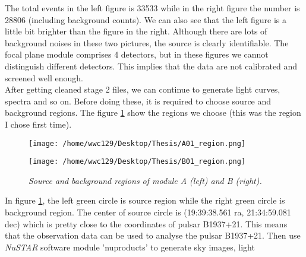 \documentclass[12pt]{report}
\newcommand{\mycaption}[1]{\caption{\textit{\footnotesize #1}}}
\begin{document}
        The total events in the left figure is 33533 while in the right figure the number is 28806 
        (including background counts). We can also see that the left figure is a little bit brighter than the figure
        in the right. Although there are lots of background noises in these two pictures, 
        the source is clearly identifiable. 
        The focal plane module comprises 4 detectors, but in these figures we cannot distinguish different detectors.
        This implies that the data are not calibrated and screened well enough. \\
        \indent After getting cleaned stage 2 files, we can continue to generate light curves, spectra and so on. 
        Before doing these, it is required to choose source and background regions. The figure \ref{fig:sky0}
        show the regions we choose (this was the region I chose first time). \\
        \begin{figure}[h]
          \begin{minipage}{0.45\textwidth} 
            \begin{flushright} 
            \texttt{[image: /home/wwc129/Desktop/Thesis/A01\_region.png]}
            \end{flushright}
          \end{minipage}
          \hspace{1cm} 
          \begin{minipage}{0.45\textwidth}
            \begin{flushleft}
            \texttt{[image: /home/wwc129/Desktop/Thesis/B01\_region.png]}
            \end{flushleft}
          \end{minipage}
          \begin{minipage}[b]{0.85\textwidth}
            \vspace{0.25cm}
            \mycaption{Source and background regions of module A (left) and B (right).}
            \label{fig:sky0}
          \end{minipage}
        \end{figure}
        \indent In figure \ref{fig:sky0}, the left green circle is source region while the right green 
        circle is 
        background region. The center of source circle is (19:39:38.561 ra, 21:34:59.081 dec) which is pretty 
        close to the coordinates of pulsar B1937+21. This means that the observation data can be used to analyse 
        the pulsar B1937+21. Then use \textit{NuSTAR} software module 'nuproducts' to generate sky images, light 
\end{document}
